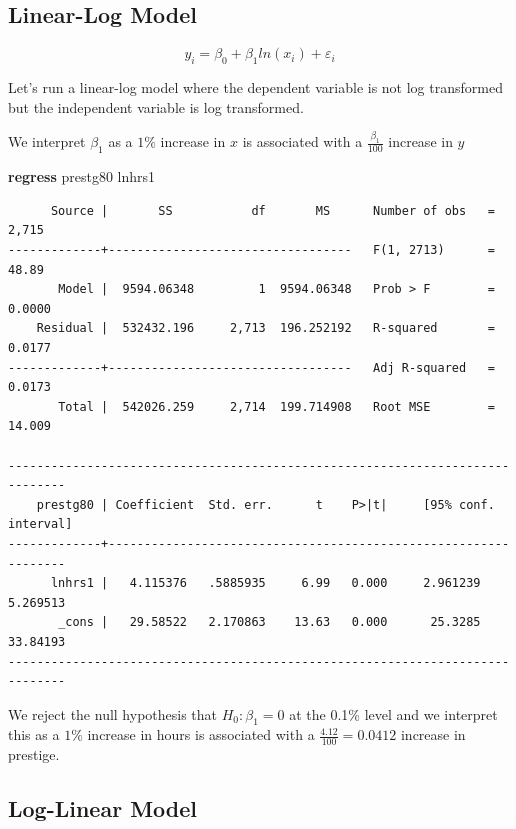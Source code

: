 \documentclass[
]{book}
\newenvironment{Shaded}{\begin{snugshade}}{\end{snugshade}}
\newcommand{\KeywordTok}[1]{\textcolor[rgb]{0.13,0.29,0.53}{\textbf{#1}}}
\newcommand{\NormalTok}[1]{#1}
\begin{document}
\subsection{Linear-Log Model}\label{linear-log-model}

\[ y_i = \beta_0 + \beta_1 ln(x_i) + \varepsilon_i \]

Let's run a linear-log model where the dependent variable is not log transformed but the independent variable is log transformed.

We interpret \(\beta_1\) as a \(1\%\) increase in \(x\) is associated with a \(\frac{\beta_1}{100}\) increase in \(y\)

\begin{Shaded}
\begin{Highlighting}[]
\KeywordTok{regress}\NormalTok{ prestg80 lnhrs1}
\end{Highlighting}
\end{Shaded}

\begin{verbatim}
      Source |       SS           df       MS      Number of obs   =     2,715
-------------+----------------------------------   F(1, 2713)      =     48.89
       Model |  9594.06348         1  9594.06348   Prob > F        =    0.0000
    Residual |  532432.196     2,713  196.252192   R-squared       =    0.0177
-------------+----------------------------------   Adj R-squared   =    0.0173
       Total |  542026.259     2,714  199.714908   Root MSE        =    14.009

------------------------------------------------------------------------------
    prestg80 | Coefficient  Std. err.      t    P>|t|     [95% conf. interval]
-------------+----------------------------------------------------------------
      lnhrs1 |   4.115376   .5885935     6.99   0.000     2.961239    5.269513
       _cons |   29.58522   2.170863    13.63   0.000      25.3285    33.84193
------------------------------------------------------------------------------
\end{verbatim}

We reject the null hypothesis that \(H_0: \beta_1 = 0\) at the 0.1\% level and we interpret this as a \(1\%\) increase in hours is associated with a \(\frac{4.12}{100}=0.0412\) increase in prestige.

\subsection{Log-Linear Model}\label{log-linear-model}
\end{document}
